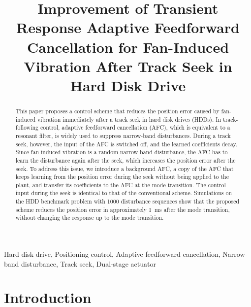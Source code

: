 \documentclass[conference]{IEEEtran}
\begin{document}
\title{Improvement of Transient Response Adaptive Feedforward Cancellation
for Fan-Induced Vibration After Track Seek in Hard Disk Drive}

\author{
\and
{}
}

\maketitle

\begin{abstract}
This paper proposes a control scheme that reduces the position error caused by
fan-induced vibration immediately after a track seek in hard disk drives
(HDDs). In track-following control, adaptive feedforward cancellation (AFC),
which is equivalent to a resonant filter, is widely used to suppress
narrow-band disturbances. During a track seek, however, the input of the AFC is
switched off, and the learned coefficients decay. Since fan-induced vibration
is a random narrow-band disturbance, the AFC has to learn the disturbance again
after the seek, which increases the position error after the seek. To address this issue, we introduce a background AFC, a copy of
the AFC that keeps learning from the position error during the seek without
being applied to the plant, and transfer its coefficients to the AFC at the
mode transition. The control input during the seek is identical to that of the
conventional scheme. Simulations on the HDD benchmark problem with 1000
disturbance sequences show that the proposed scheme reduces the position error
in approximately 1~ms after the mode transition, without changing the
response up to the mode transition.
\end{abstract}

\begin{IEEEkeywords}
Hard disk drive, Positioning control, Adaptive feedforward cancellation,
Narrow-band disturbance, Track seek, Dual-stage actuator
\end{IEEEkeywords}

\section{Introduction}
\end{document}
